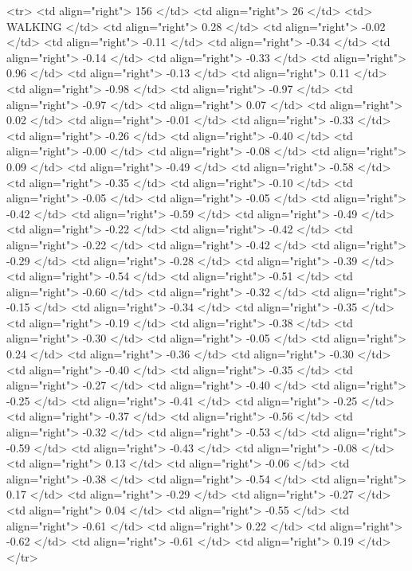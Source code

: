   <tr> <td align="right"> 156 </td> <td align="right">  26 </td> <td> WALKING </td> <td align="right"> 0.28 </td> <td align="right"> -0.02 </td> <td align="right"> -0.11 </td> <td align="right"> -0.34 </td> <td align="right"> -0.14 </td> <td align="right"> -0.33 </td> <td align="right"> 0.96 </td> <td align="right"> -0.13 </td> <td align="right"> 0.11 </td> <td align="right"> -0.98 </td> <td align="right"> -0.97 </td> <td align="right"> -0.97 </td> <td align="right"> 0.07 </td> <td align="right"> 0.02 </td> <td align="right"> -0.01 </td> <td align="right"> -0.33 </td> <td align="right"> -0.26 </td> <td align="right"> -0.40 </td> <td align="right"> -0.00 </td> <td align="right"> -0.08 </td> <td align="right"> 0.09 </td> <td align="right"> -0.49 </td> <td align="right"> -0.58 </td> <td align="right"> -0.35 </td> <td align="right"> -0.10 </td> <td align="right"> -0.05 </td> <td align="right"> -0.05 </td> <td align="right"> -0.42 </td> <td align="right"> -0.59 </td> <td align="right"> -0.49 </td> <td align="right"> -0.22 </td> <td align="right"> -0.42 </td> <td align="right"> -0.22 </td> <td align="right"> -0.42 </td> <td align="right"> -0.29 </td> <td align="right"> -0.28 </td> <td align="right"> -0.39 </td> <td align="right"> -0.54 </td> <td align="right"> -0.51 </td> <td align="right"> -0.60 </td> <td align="right"> -0.32 </td> <td align="right"> -0.15 </td> <td align="right"> -0.34 </td> <td align="right"> -0.35 </td> <td align="right"> -0.19 </td> <td align="right"> -0.38 </td> <td align="right"> -0.30 </td> <td align="right"> -0.05 </td> <td align="right"> 0.24 </td> <td align="right"> -0.36 </td> <td align="right"> -0.30 </td> <td align="right"> -0.40 </td> <td align="right"> -0.35 </td> <td align="right"> -0.27 </td> <td align="right"> -0.40 </td> <td align="right"> -0.25 </td> <td align="right"> -0.41 </td> <td align="right"> -0.25 </td> <td align="right"> -0.37 </td> <td align="right"> -0.56 </td> <td align="right"> -0.32 </td> <td align="right"> -0.53 </td> <td align="right"> -0.59 </td> <td align="right"> -0.43 </td> <td align="right"> -0.08 </td> <td align="right"> 0.13 </td> <td align="right"> -0.06 </td> <td align="right"> -0.38 </td> <td align="right"> -0.54 </td> <td align="right"> 0.17 </td> <td align="right"> -0.29 </td> <td align="right"> -0.27 </td> <td align="right"> 0.04 </td> <td align="right"> -0.55 </td> <td align="right"> -0.61 </td> <td align="right"> 0.22 </td> <td align="right"> -0.62 </td> <td align="right"> -0.61 </td> <td align="right"> 0.19 </td> </tr>
